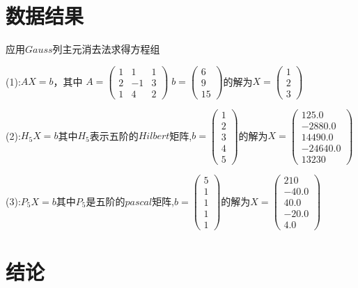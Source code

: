 \documentclass[12pt, a4paper, oneside]{ctexart}
\begin{document}
\section*{数据结果}
应用$Gauss$列主元消去法求得方程组\par
(1):$AX = b$，其中 $A = \begin{pmatrix}
    1 & 1 & 1\\
    2 & -1 & 3\\
    1 & 4 & 2
\end{pmatrix} \; b = \begin{pmatrix}
    6\\9\\15
\end{pmatrix}$的解为$X = \begin{pmatrix}
    1\\2\\3
\end{pmatrix}$

(2):$H_5X = b$其中$H_5$表示五阶的$Hilbert$矩阵,$b = \begin{pmatrix}
    1\\2\\3\\4\\5
\end{pmatrix}$的解为$X = \begin{pmatrix}
    125.0\\-2880.0\\14490.0\\-24640.0\\13230
\end{pmatrix}$

(3):$P_5X = b$其中$P_5$是五阶的$pascal$矩阵,$b = \begin{pmatrix}
    5\\1\\1\\1\\1
\end{pmatrix}$的解为$X = \begin{pmatrix}
    210\\-40.0\\40.0\\-20.0\\4.0
\end{pmatrix}$


\section*{结论}
\end{document}
